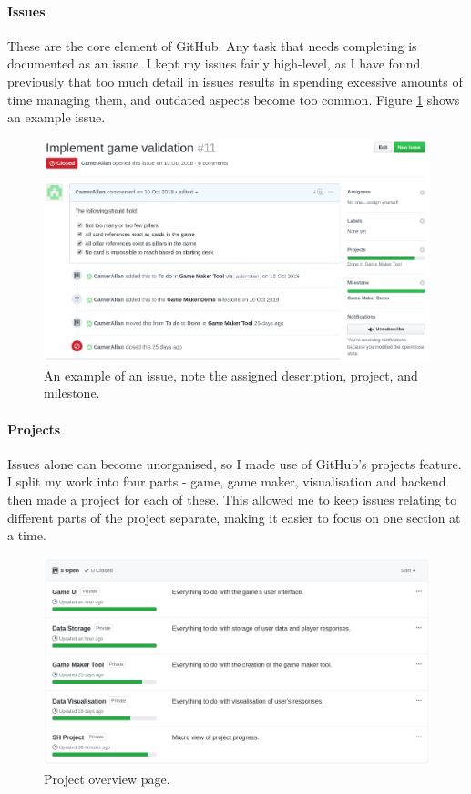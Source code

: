 \paragraph{Issues} These are the core element of GitHub. Any task that needs completing is documented as an issue.
I kept my issues fairly high-level, as I have found previously that too much detail in issues results in spending excessive amounts of time managing them, and outdated aspects become too common. Figure \ref{fig:issue} shows an example issue.

\begin{figure}[!h]
	\centering
	\includegraphics[width=1.0\textwidth]{./images/softeng/issue.png}
	\caption{An example of an issue, note the assigned description, project, and milestone.}
	\label{fig:issue}
\end{figure}

\paragraph{Projects} Issues alone can become unorganised, so I made use of GitHub's projects feature. 
I split my work into four parts - game, game maker, visualisation and backend then made a project for each of these. 
This allowed me to keep issues relating to different parts of the project separate, making it easier to focus on one section at a time.

\begin{figure}[!h]
	\centering
	\includegraphics[width=1.0\textwidth]{./images/softeng/projects.png}
	\caption{Project overview page.}
	\label{fig:projects}
\end{figure}

